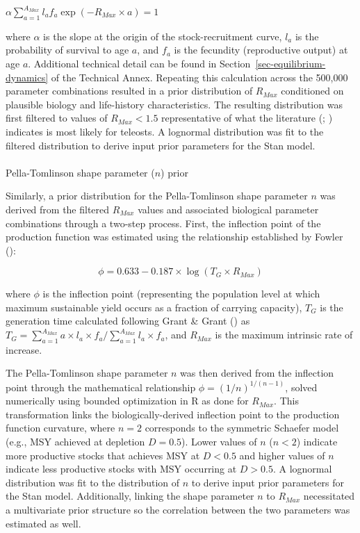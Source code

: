 \documentclass[
  11pt,
]{SCreport}
\makeatletter
\let\oldparagraph\paragraph
\renewcommand{\paragraph}{
    \@ifstar
      \xxxParagraphStar
      \xxxParagraphNoStar
  }
\newcommand{\xxxParagraphStar}[1]{\oldparagraph*{#1}\mbox{}}
\newcommand{\xxxParagraphNoStar}[1]{\oldparagraph{#1}\mbox{}}
\makeatother
\begin{document}
\(\alpha \sum_{a=1}^{A_{Max}} l_a f_a \exp(-R_{Max} \times a) = 1\)

where \(\alpha\) is the slope at the origin of the stock-recruitment
curve, \(l_a\) is the probability of survival to age \(a\), and \(f_a\)
is the fecundity (reproductive output) at age \(a\). Additional
technical detail can be found in Section~\ref{sec-equilibrium-dynamics}
of the Technical Annex. Repeating this calculation across the 500,000
parameter combinations resulted in a prior distribution of \(R_{Max}\)
conditioned on plausible biology and life-history characteristics. The
resulting distribution was first filtered to values of \(R_{Max} < 1.5\)
representative of what the literature
(;
)
indicates is most likely for teleosts. A lognormal distribution was fit
to the filtered distribution to derive input prior parameters for the
Stan model.

\paragraph{\texorpdfstring{Pella-Tomlinson shape parameter (\(n\))
prior}{Pella-Tomlinson shape parameter (n) prior}}\label{sec-shape-prior}

Similarly, a prior distribution for the Pella-Tomlinson shape parameter
\(n\) was derived from the filtered \(R_{Max}\) values and associated
biological parameter combinations through a two-step process. First, the
inflection point of the production function was estimated using the
relationship established by Fowler
():

\[\phi = 0.633 - 0.187 \times \log(T_G \times R_{Max})\]

where \(\phi\) is the inflection point (representing the population
level at which maximum sustainable yield occurs as a fraction of
carrying capacity), \(T_G\) is the generation time calculated following
Grant \& Grant () as
\(T_G = \sum_{a=1}^{A_{Max}} a \times l_a \times f_a / \sum_{a=1}^{A_{Max}} l_a \times f_a\),
and \(R_{Max}\) is the maximum intrinsic rate of increase.

The Pella-Tomlinson shape parameter \(n\) was then derived from the
inflection point through the mathematical relationship
\(\phi = (1/n)^{1/(n-1)}\), solved numerically using bounded
optimization in R as done for \(R_{Max}\). This transformation links the
biologically-derived inflection point to the production function
curvature, where \(n = 2\) corresponds to the symmetric Schaefer model
(e.g., MSY achieved at depletion \(D = 0.5\)). Lower values of \(n\)
(\(n<2\)) indicate more productive stocks that achieves MSY at
\(D < 0.5\) and higher values of \(n\) indicate less productive stocks
with MSY occurring at \(D > 0.5\). A lognormal distribution was fit to
the distribution of \(n\) to derive input prior parameters for the Stan
model. Additionally, linking the shape parameter \(n\) to \(R_{Max}\)
necessitated a multivariate prior structure so the correlation between
the two parameters was estimated as well.
\end{document}
